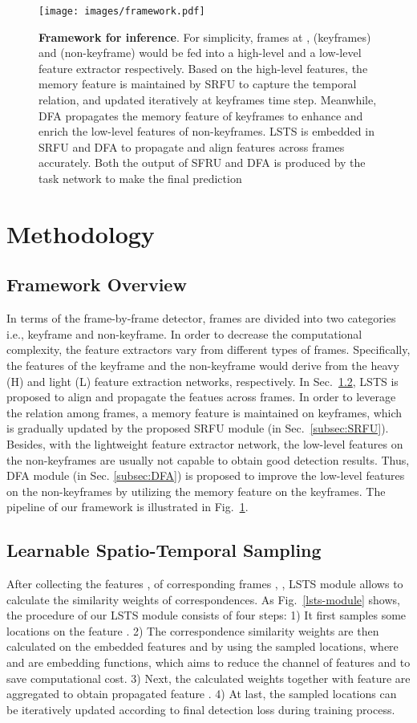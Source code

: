 \documentclass[runningheads]{llncs}
\begin{document}
\begin{figure}[t]
\centering
\texttt{[image: images/framework.pdf]}
\caption{
\textbf{Framework for inference}. 
For simplicity, frames at ,  (keyframes) and  (non-keyframe) would be fed into a high-level and a low-level feature extractor respectively.
Based on the high-level features, the memory feature  is maintained by SRFU to capture the temporal relation, and updated iteratively at keyframes time step.
Meanwhile, DFA propagates the memory feature  of keyframes to enhance and enrich the low-level features of non-keyframes. 
LSTS is embedded in SRFU and DFA to propagate and align features across frames accurately. 
Both the output of SFRU and DFA is produced by the task network to make the final prediction
}
\label{framework}
\end{figure}

\section{Methodology}\label{sec:method}
\subsection{Framework Overview}
In terms of the frame-by-frame detector, frames are divided into two categories i.e., keyframe and non-keyframe. 
In order to decrease the computational complexity, the feature extractors vary from different types of frames.
Specifically, the features of the keyframe and the non-keyframe would derive from the heavy (H) and light (L) feature extraction networks, respectively.
In Sec.~\ref{subsec:LSTS}, LSTS is proposed to align and propagate the featues across frames.
In order to leverage the relation among frames, a memory feature  is maintained on keyframes, which is gradually updated by the proposed SRFU module (in Sec.~\ref{subsec:SRFU}). 
Besides, with the lightweight feature extractor network, the low-level features on the non-keyframes are usually not capable to obtain good detection results. 
Thus, DFA module (in Sec. \ref{subsec:DFA}) is proposed to improve the low-level features on the non-keyframes by utilizing the memory feature  on the keyframes. 
The pipeline of our framework is illustrated in Fig.~\ref{framework}.


\subsection{Learnable Spatio-Temporal Sampling}\label{subsec:LSTS}
 After collecting the features ,  of corresponding frames , , LSTS module allows to calculate the similarity weights of correspondences. As Fig.~\ref{lsts-module} shows, the procedure of our LSTS module consists of four steps:  
1) It first samples some locations on the feature . 
2) The correspondence similarity weights are then calculated on the embedded features  and  by using the sampled locations, where  and  are embedding functions, which aims to reduce the channel of features  and  to save computational cost.
 3) Next, the calculated weights together with feature  are aggregated to obtain propagated feature . 
 4) At last, the sampled locations can be iteratively updated according to final detection loss during training process. 
\end{document}
